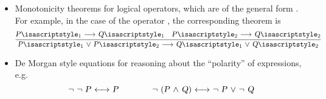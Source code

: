 \begin{isabellebody}
\begin{isamarkuptext}
\begin{itemize}
  \item Monotonicity theorems for logical operators, which are of the
  general form .  For example, in
  the case of the operator , the corresponding theorem is
  \[
  \infer{\isa{{\isaliteral{22}{\isachardoublequote}}P\isaliteral{5C3C5E7375623E}{}\isactrlsub {\isadigit{1}}\ {\isaliteral{5C3C6F723E}{\isasymor}}\ P\isaliteral{5C3C5E7375623E}{}\isactrlsub {\isadigit{2}}\ {\isaliteral{5C3C6C6F6E6772696768746172726F773E}{\isasymlongrightarrow}}\ Q\isaliteral{5C3C5E7375623E}{}\isactrlsub {\isadigit{1}}\ {\isaliteral{5C3C6F723E}{\isasymor}}\ Q\isaliteral{5C3C5E7375623E}{}\isactrlsub {\isadigit{2}}{\isaliteral{22}{\isachardoublequote}}}}{\isa{{\isaliteral{22}{\isachardoublequote}}P\isaliteral{5C3C5E7375623E}{}\isactrlsub {\isadigit{1}}\ {\isaliteral{5C3C6C6F6E6772696768746172726F773E}{\isasymlongrightarrow}}\ Q\isaliteral{5C3C5E7375623E}{}\isactrlsub {\isadigit{1}}{\isaliteral{22}{\isachardoublequote}}} & \isa{{\isaliteral{22}{\isachardoublequote}}P\isaliteral{5C3C5E7375623E}{}\isactrlsub {\isadigit{2}}\ {\isaliteral{5C3C6C6F6E6772696768746172726F773E}{\isasymlongrightarrow}}\ Q\isaliteral{5C3C5E7375623E}{}\isactrlsub {\isadigit{2}}{\isaliteral{22}{\isachardoublequote}}}}
  \]

  \item De Morgan style equations for reasoning about the ``polarity''
  of expressions, e.g.
  \[
  \isa{{\isaliteral{22}{\isachardoublequote}}{\isaliteral{5C3C6E6F743E}{\isasymnot}}\ {\isaliteral{5C3C6E6F743E}{\isasymnot}}\ P\ {\isaliteral{5C3C6C6F6E676C65667472696768746172726F773E}{\isasymlongleftrightarrow}}\ P{\isaliteral{22}{\isachardoublequote}}} \qquad\qquad
  \isa{{\isaliteral{22}{\isachardoublequote}}{\isaliteral{5C3C6E6F743E}{\isasymnot}}\ {\isaliteral{28}{\isacharparenleft}}P\ {\isaliteral{5C3C616E643E}{\isasymand}}\ Q{\isaliteral{29}{\isacharparenright}}\ {\isaliteral{5C3C6C6F6E676C65667472696768746172726F773E}{\isasymlongleftrightarrow}}\ {\isaliteral{5C3C6E6F743E}{\isasymnot}}\ P\ {\isaliteral{5C3C6F723E}{\isasymor}}\ {\isaliteral{5C3C6E6F743E}{\isasymnot}}\ Q{\isaliteral{22}{\isachardoublequote}}}
  \]


\end{itemize}
\end{isamarkuptext}
\end{isabellebody}
